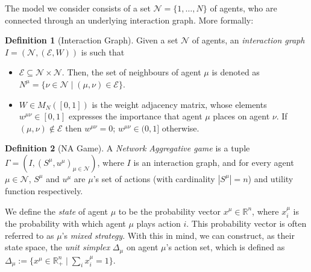 \documentclass{article}
\theoremstyle{definition}
\newtheorem{definition}{Definition}
\newcommand{\agentset}{\mathcal{N}}
\newcommand{\edgeset}{\mathcal{E}}
\newcommand{\weightset}{W}
\newcommand{\actionset}[1]{S^{#1}}
\newcommand{\utility}[1]{u^{#1}}
\newcommand{\wmunu}{w^{\mu \nu}}
\newcommand{\xmu}{x^{\mu}}
\newcommand{\xmuaction}[1]{x^{\mu}_{#1}}
\begin{document}
The model we consider consists of
a set $\agentset = \{1,
\ldots , N \}$ of agents, who are connected through an underlying
interaction graph.
More formally:
%        
\begin{definition}[Interaction Graph] \label{interactiongraph}
	Given a set  $\agentset$ of agents, an {\em interaction graph} $I = (\agentset, (\edgeset,
	\weightset))$ is such that
	\begin{itemize}[leftmargin=0.5cm]
		
		\item $\edgeset \subseteq \agentset \times \agentset$.  Then, the set of
		neighbours of agent $\mu$ is denoted as $N^\mu = \{\nu \in
		\agentset \mid (\mu, \nu) \in \edgeset\}$.
		
		\item $\weightset \in M_N([0, 1])$ is the weight adjacency matrix, whose elements $w^{\mu
			\nu} \in [0, 1]$ expresses the importance that agent $\mu$ places on agent $\nu$. If $(\mu, \nu) \not
		\in \edgeset$ then $w^{\mu \nu} = 0$;        $\wmunu \in (0, 1]$ otherwise.
	\end{itemize}
\end{definition}

%
\begin{definition}[NA Game]
	A {\em Network Aggregative game} is
	a tuple $\Gamma = (I, (\actionset{\mu},
	\utility{\mu})_{\mu \in \mathcal{N}})$, where $I$ is an
	interaction graph, and for every agent $\mu \in \mathcal{N}$, $\actionset{\mu}$ and $\utility{\mu}$
	are $\mu$'s set of actions (with cardinality $|\actionset{\mu}| = n$)
	and utility function respectively.
\end{definition}

We define the \emph{state} of agent $\mu$ to be the probability
vector $\xmu \in \mathbb{R}^n$, where $\xmu_i$ is the probability
with which agent $\mu$ plays action $i$.
This
probability vector is often referred to as $\mu$'s \emph{mixed
	strategy}. With this in mind, we can construct, as their state
space, the {\em unit simplex} $\Delta_\mu$ on agent $\mu$'s action set, which
is defined
as $\Delta_\mu := \{\xmu \in \mathbb{R}^n_+ \mid \sum_i
\xmuaction{i} = 1\}$. 
\end{document}

